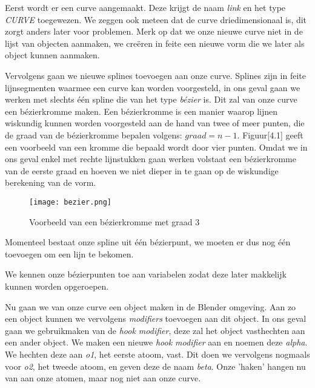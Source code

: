 

Eerst wordt er een curve aangemaakt. Deze krijgt de naam \textit{link} en het type \textit{CURVE} toegewezen. We zeggen ook meteen dat de curve driedimensionaal is, dit zorgt anders later voor problemen. Merk op dat we onze nieuwe curve niet in de lijst van objecten aanmaken, we creëren in feite een nieuwe vorm die we later als object kunnen aanmaken. 


Vervolgens gaan we nieuwe splines toevoegen aan onze curve. Splines zijn in feite lijnsegmenten waarmee een curve kan worden voorgesteld, in ons geval gaan we werken met slechts één spline die van het type \textit{bézier} is. Dit zal van onze curve een bézierkromme maken. Een bézierkromme is een manier waarop lijnen wiskundig kunnen worden voorgesteld aan de hand van twee of meer punten, die de graad van de 	bézierkromme bepalen volgens: $graad = n - 1$. Figuur[4.1] geeft een voorbeeld van een kromme die bepaald wordt door vier punten. Omdat we in ons geval enkel met rechte lijnstukken gaan werken volstaat een bézierkromme van de eerste graad en hoeven we niet dieper in te gaan op de wiskundige berekening van de vorm.

\begin{figure}[H]
\begin{center}
\texttt{[image: bezier.png]}
\caption{Voorbeeld van een bézierkromme met graad 3 \citep*{BEZ1}}
\end{center}
\end{figure}

Momenteel bestaat onze spline uit één bézierpunt, we moeten er dus nog één toevoegen om een lijn te bekomen.



We kennen onze bézierpunten toe aan variabelen zodat deze later makkelijk kunnen worden opgeroepen.



Nu gaan we van onze curve een object maken in de Blender omgeving. Aan zo een object kunnen we vervolgens \textit{modifiers} toevoegen aan dit object. In ons geval gaan we gebruikmaken van de \textit{hook modifier}, deze zal het object vasthechten aan een ander object. We maken een nieuwe \textit{hook modifier} aan en noemen deze \textit{alpha}. We hechten deze aan \textit{o1}, het eerste atoom, vast. Dit doen we vervolgens nogmaals voor \textit{o2}, het tweede atoom, en geven deze de naam \textit{beta}. Onze 'haken' hangen nu van aan onze atomen, maar nog niet aan onze curve.


